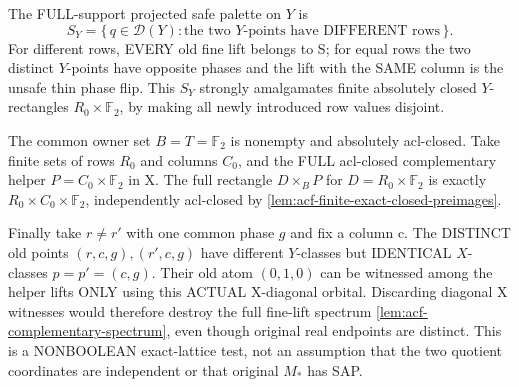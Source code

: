 \begin{example}
The FULL-support
projected safe palette
on $Y$ is
\[
 S_Y=\{\,q\in\mathcal D(Y):
       \text{the two }Y\text{-points
       have DIFFERENT rows}\,\}.
\]
For different rows,
EVERY old fine lift
belongs to S; for equal
rows the two distinct
$Y$-points have opposite
phases and the lift with
the SAME column is the
unsafe thin phase flip.
This $S_Y$ strongly
amalgamates finite
absolutely closed
$Y$-rectangles
$R_0\times\mathbb F_2$,
by making all newly
introduced row values
disjoint.

The common owner set
$B=T=\mathbb F_2$
is nonempty and
absolutely acl-closed.
Take finite sets of
rows $R_0$ and columns
$C_0$, and the FULL
acl-closed complementary
helper
$P=C_0\times\mathbb F_2$
in X. The full rectangle
$D\times_B P$ for
$D=R_0\times\mathbb F_2$
is exactly
$R_0\times C_0\times
\mathbb F_2$, independently
acl-closed by
\cref{lem:acf-finite-exact-closed-preimages}.

Finally take $r\ne r'$
with one common
phase $g$ and fix a
column c. The DISTINCT
old points
$(r,c,g),(r',c,g)$
have different $Y$-classes
but IDENTICAL $X$-classes
$p=p'=(c,g)$. Their
old atom $(0,1,0)$
can be witnessed among
the helper lifts ONLY
using this ACTUAL
X-diagonal orbital.
Discarding diagonal
X witnesses would
therefore destroy the
full fine-lift spectrum
\cref{lem:acf-complementary-spectrum},
even though original
real endpoints are
distinct. This is a
NONBOOLEAN exact-lattice
test, not an assumption
that the two quotient
coordinates are independent
or that original
$M_*$ has SAP.
\end{example}

